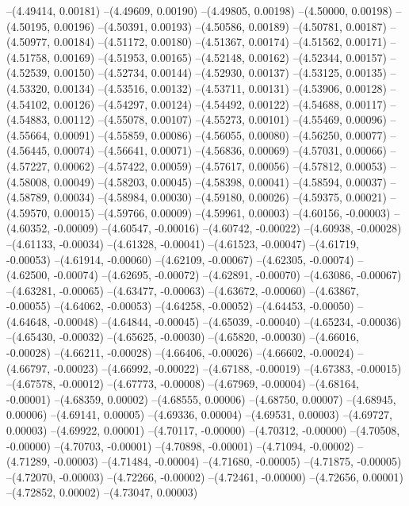 --(4.49414, 0.00181)
--(4.49609, 0.00190)
--(4.49805, 0.00198)
--(4.50000, 0.00198)
--(4.50195, 0.00196)
--(4.50391, 0.00193)
--(4.50586, 0.00189)
--(4.50781, 0.00187)
--(4.50977, 0.00184)
--(4.51172, 0.00180)
--(4.51367, 0.00174)
--(4.51562, 0.00171)
--(4.51758, 0.00169)
--(4.51953, 0.00165)
--(4.52148, 0.00162)
--(4.52344, 0.00157)
--(4.52539, 0.00150)
--(4.52734, 0.00144)
--(4.52930, 0.00137)
--(4.53125, 0.00135)
--(4.53320, 0.00134)
--(4.53516, 0.00132)
--(4.53711, 0.00131)
--(4.53906, 0.00128)
--(4.54102, 0.00126)
--(4.54297, 0.00124)
--(4.54492, 0.00122)
--(4.54688, 0.00117)
--(4.54883, 0.00112)
--(4.55078, 0.00107)
--(4.55273, 0.00101)
--(4.55469, 0.00096)
--(4.55664, 0.00091)
--(4.55859, 0.00086)
--(4.56055, 0.00080)
--(4.56250, 0.00077)
--(4.56445, 0.00074)
--(4.56641, 0.00071)
--(4.56836, 0.00069)
--(4.57031, 0.00066)
--(4.57227, 0.00062)
--(4.57422, 0.00059)
--(4.57617, 0.00056)
--(4.57812, 0.00053)
--(4.58008, 0.00049)
--(4.58203, 0.00045)
--(4.58398, 0.00041)
--(4.58594, 0.00037)
--(4.58789, 0.00034)
--(4.58984, 0.00030)
--(4.59180, 0.00026)
--(4.59375, 0.00021)
--(4.59570, 0.00015)
--(4.59766, 0.00009)
--(4.59961, 0.00003)
--(4.60156, -0.00003)
--(4.60352, -0.00009)
--(4.60547, -0.00016)
--(4.60742, -0.00022)
--(4.60938, -0.00028)
--(4.61133, -0.00034)
--(4.61328, -0.00041)
--(4.61523, -0.00047)
--(4.61719, -0.00053)
--(4.61914, -0.00060)
--(4.62109, -0.00067)
--(4.62305, -0.00074)
--(4.62500, -0.00074)
--(4.62695, -0.00072)
--(4.62891, -0.00070)
--(4.63086, -0.00067)
--(4.63281, -0.00065)
--(4.63477, -0.00063)
--(4.63672, -0.00060)
--(4.63867, -0.00055)
--(4.64062, -0.00053)
--(4.64258, -0.00052)
--(4.64453, -0.00050)
--(4.64648, -0.00048)
--(4.64844, -0.00045)
--(4.65039, -0.00040)
--(4.65234, -0.00036)
--(4.65430, -0.00032)
--(4.65625, -0.00030)
--(4.65820, -0.00030)
--(4.66016, -0.00028)
--(4.66211, -0.00028)
--(4.66406, -0.00026)
--(4.66602, -0.00024)
--(4.66797, -0.00023)
--(4.66992, -0.00022)
--(4.67188, -0.00019)
--(4.67383, -0.00015)
--(4.67578, -0.00012)
--(4.67773, -0.00008)
--(4.67969, -0.00004)
--(4.68164, -0.00001)
--(4.68359, 0.00002)
--(4.68555, 0.00006)
--(4.68750, 0.00007)
--(4.68945, 0.00006)
--(4.69141, 0.00005)
--(4.69336, 0.00004)
--(4.69531, 0.00003)
--(4.69727, 0.00003)
--(4.69922, 0.00001)
--(4.70117, -0.00000)
--(4.70312, -0.00000)
--(4.70508, -0.00000)
--(4.70703, -0.00001)
--(4.70898, -0.00001)
--(4.71094, -0.00002)
--(4.71289, -0.00003)
--(4.71484, -0.00004)
--(4.71680, -0.00005)
--(4.71875, -0.00005)
--(4.72070, -0.00003)
--(4.72266, -0.00002)
--(4.72461, -0.00000)
--(4.72656, 0.00001)
--(4.72852, 0.00002)
--(4.73047, 0.00003)
